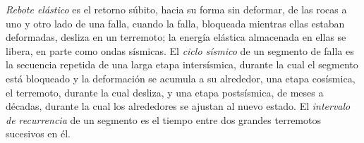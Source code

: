 \begin{definition}\label{def:b1:earthquake-source:seismic-cycle}
\emph{Rebote elástico} es el retorno súbito, hacia su forma sin deformar, de las rocas a uno y otro lado de una
falla, cuando la falla, bloqueada mientras ellas estaban deformadas, desliza en un terremoto; la energía elástica almacenada en
ellas se libera, en parte como ondas sísmicas. El \emph{ciclo sísmico} de un segmento de falla es la secuencia
repetida de una larga etapa intersísmica, durante la cual el segmento está bloqueado y la deformación se acumula a su alrededor, una
etapa cosísmica, el terremoto, durante la cual desliza, y una etapa postsísmica, de meses a décadas, durante la cual los alrededores
se ajustan al nuevo estado. El \emph{intervalo de recurrencia} de un segmento es el tiempo entre dos
grandes terremotos sucesivos en él.
\end{definition}

